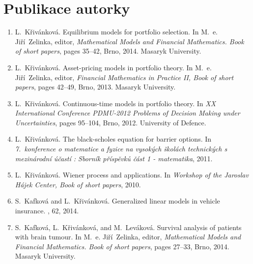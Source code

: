 \documentclass[a4paper,12pt]{report}
\theoremstyle{definition} \newtheorem{definice}[veta]{Definice}
\theoremstyle{remark}
\begin{document}
\section*{Publikace autorky}
%
%
\begin{enumerate}
\renewcommand\labelenumi{\Roman{enumi}.}
\item
L.~Křivánková.
\newblock Equilibrium models for portfolio selection.
\newblock In M.~e. Jiří~Zelinka, editor, {\em Mathematical Models and
  Financial Mathematics. Book of short papers}, pages 35--42, Brno, 2014.
  Masaryk University.

\item
L.~Křivánková.
\newblock Asset-pricing models in portfolio theory.
\newblock In M.~e. Jiří~Zelinka, editor, {\em Financial Mathematics in
  Practice II, Book of short papers}, pages 42--49, Brno, 2013. Masaryk
  University.

\item
L.~Křivánková.
\newblock Continuous-time models in portfolio theory.
\newblock In {\em XX International Conference PDMU-2012 Problems of Decision
  Making under Uncertainties}, pages 95--104, Brno, 2012. University of
  Defence.

\item
L.~Křivánková.
\newblock The black-scholes equation for barrier options.
\newblock In {\em 7.~konference o matematice a fyzice na vysokých školách
  technických s mezinárodní účastí : Sborník příspěvků část 1 -
  matematika}, 2011.

\item
L.~Křivánková.
\newblock Wiener process and applications.
\newblock In {\em Workshop of the Jaroslav Hájek Center, Book of short
  papers}, 2010.

\item
S.~Kafková and L.~Křivánková.
\newblock Generalized linear models in vehicle insurance.
, 62, 2014.

\item
S.~Kafková, L.~Křivánková, and M.~Leváková.
\newblock Survival analysis of patients with brain tumour.
\newblock In M.~e. Jiří~Zelinka, editor, {\em Mathematical Models and
  Financial Mathematics. Book of short papers}, pages 27--33, Brno, 2014.
  Masaryk University.


\end{enumerate}
\end{document}
